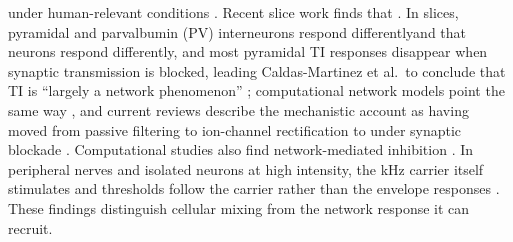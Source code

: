 \documentclass[11pt,a4paper]{article}
\providecommand{\DIFaddtex}[1]{{\protect\color{blue} \sf #1}} %
\providecommand{\DIFdeltex}[1]{{\protect\color{red} \scriptsize #1}} %
\providecommand{\DIFaddbegin}{} %
\providecommand{\DIFaddend}{} %
\providecommand{\DIFdelbegin}{} %
\providecommand{\DIFdelend}{} %
\providecommand{\DIFadd}[1]{\texorpdfstring{\DIFaddtex{#1}}{#1}} %
\providecommand{\DIFdel}[1]{\texorpdfstring{\DIFdeltex{#1}}{}} %
\begin{document}
\DIFdelbegin \DIFdel{under
human-relevant conditions \cite{vieira2024}. Recent slice work
finds that }\DIFdelend \DIFaddbegin \DIFadd{\cite{vieira2024}. In slices, }\DIFaddend pyramidal and parvalbumin (PV) \DIFdelbegin \DIFdel{interneurons respond differentlyand
that }\DIFdelend \DIFaddbegin \DIFadd{neurons respond differently,
and }\DIFaddend most pyramidal TI responses disappear \DIFdelbegin \DIFdel{when synaptic transmission is blocked,
leading Caldas-Martinez et al.\ to conclude that TI is ``largely a network
phenomenon'' \cite{caldas2024}; computational network models point the same way
\cite{karimi2024,soroushi2025}, and current reviews describe the mechanistic account as
having moved from passive filtering to ion-channel rectification to }\DIFdelend \DIFaddbegin \DIFadd{under synaptic blockade \cite{caldas2024}.
Computational studies also find }\DIFaddend network-mediated \DIFdelbegin \DIFdel{inhibition \cite{wangw2026}. In peripheral nerves and isolated neurons at high intensity,
the kHz carrier itself stimulates and thresholds follow the carrier rather than the
envelope \cite{opancar2025,semenov2025}}\DIFdelend \DIFaddbegin \DIFadd{responses
\cite{karimi2024,soroushi2025,wangw2026}. These findings distinguish cellular mixing from
the network response it can recruit}\DIFaddend .
\end{document}
